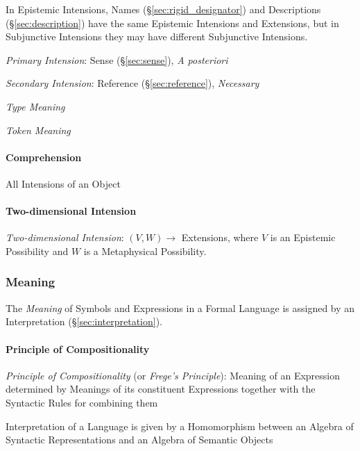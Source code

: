 In Epistemic Intensions, Names (\S\ref{sec:rigid_designator}) and
Descriptions (\S\ref{sec:description}) have the same Epistemic
Intensions and Extensions, but in Subjunctive Intensions they may have
different Subjunctive Intensions.

\emph{Primary Intension}: Sense (\S\ref{sec:sense}), \emph{A
  posteriori}

\emph{Secondary Intension}: Reference (\S\ref{sec:reference}),
\emph{Necessary}

\emph{Type Meaning}

\emph{Token Meaning}



\paragraph{Comprehension}\label{sec:comprehension}\hfill

All Intensions of an Object



\paragraph{Two-dimensional Intension}\label{sec:twodimensional_intension}\hfill

\emph{Two-dimensional Intension}: $(V,W) \rightarrow$ Extensions,
where $V$ is an Epistemic Possibility and $W$ is a Metaphysical
Possibility.



\subsubsection{Meaning}\label{sec:meaning}

The \emph{Meaning} of Symbols and Expressions in a Formal Language is
assigned by an Interpretation (\S\ref{sec:interpretation}).



\paragraph{Principle of Compositionality}\label{sec:compositionality}
\hfill

\emph{Principle of Compositionality} (or \emph{Frege's Principle}):
Meaning of an Expression determined by Meanings of its constituent
Expressions together with the Syntactic Rules for combining them

Interpretation of a Language is given by a Homomorphism between an
Algebra of Syntactic Representations and an Algebra of Semantic
Objects



